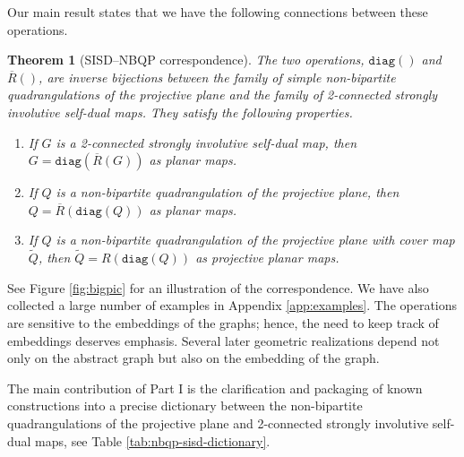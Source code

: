 \documentclass[10pt,a4paper]{article}
\newtheorem{theorem}{Theorem}[section]
\newcommand{\diag}[0]{\mathtt{diag}}
\begin{document}
Our main result states that we have the following connections between these operations.



\begin{theorem}[SISD--NBQP correspondence]\label{thm:commute} The two operations, $\diag()$ and $\overline R()$, are inverse bijections between the family of simple non-bipartite quadrangulations of the projective plane  and the family of 2-connected strongly involutive self-dual maps. They satisfy the following properties.  
\begin{enumerate}
    \item[a)] If $G$ is a 2-connected strongly involutive self-dual map, then $G=\diag(\overline R(G))$ as planar maps.
    \item[b)] If $Q$ is a non-bipartite quadrangulation of the projective plane, then $Q=\overline R(\diag(Q))$ as planar maps.
    \item[c)] If $Q$ is a non-bipartite quadrangulation of the projective plane with cover map $\widetilde Q$, then $\widetilde Q= R(\diag(Q))$ as projective planar maps.
\end{enumerate}
    \end{theorem}





 See Figure \ref{fig:bigpic} for an illustration of the correspondence. We have also collected a large number of examples in  Appendix \ref{app:examples}. The operations are sensitive to the embeddings of the graphs; hence, the need to keep track of embeddings deserves emphasis. Several later geometric realizations depend not only on the abstract graph but also on the embedding of the graph. 

The main contribution of Part I is the clarification and packaging of known constructions into a precise dictionary between the non-bipartite quadrangulations of the projective plane and 2-connected strongly involutive self-dual maps, see Table \ref{tab:nbqp-sisd-dictionary}.
\end{document}
